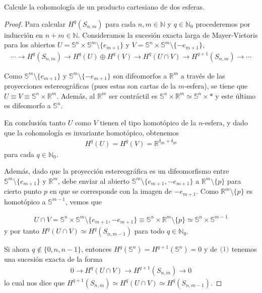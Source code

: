 \documentclass[11pt]{article}
\newcommand{\N}{\mathbb{N}}
\newcommand{\R}{\mathbb{R}}
\newcommand{\Ss}{\mathbb{S}}
\newcommand{\paint}[1]{\color{color}{#1}}
\newenvironment{exercise}[2][Ejercicio]{\begin{trivlist}
\item[\hskip \labelsep \paint{{\bfseries #1}}\hskip \labelsep {\bfseries #2.}]}{\end{trivlist}}
\begin{document}
\begin{exercise}{11 (d)} Calcule la cohomología de un producto cartesiano de dos esferas.
\end{exercise}
\begin{proof} Para calcular $H^q(S_{n,m})$ para cada $n,m \in \N$ y $q \in \N_0$ procederemos por inducción en $n+m \in \N$. Consideramos la sucesión exacta larga de Mayer-Vietoris para los abiertos $U = \Ss^n \times \Ss^m \setminus \{e_{m+1}\}$ y $V = \Ss^n \times \Ss^m \setminus \{-e_{m+1}\}$, 
\begin{align*}
\cdots \to H^q(S_{n,m}) \to H^q(U) \oplus H^q(V) \to H^q(U \cap V) \to H^{q+1}(S_{n,m}) \to \cdots
\end{align*}

Como $\Ss^m \setminus \{e_{m+1}\}$ y $\Ss^m \setminus \{-e_{m+1}\}$ son difeomorfos a $\R^m$ a través de las proyecciones estereográficas (pues estas son cartas de la $m$-esfera), se tiene que $U \equiv V \equiv \Ss^n \times \R^m$. Además, al $\R^m$ ser contráctil es $\Ss^n \times \R^m \simeq \Ss^n \times \ast$ y este último es difeomorfo a $\Ss^n$. 

En conclusión tanto $U$ como $V$ tienen el tipo homotópico de la $n$-esfera, y dado que la cohomología es invariante homotópico, obtenemos
\begin{align*}
H^q(U) = H^q(V) = \R^{\delta_{qn} + \delta_{q0}}
\end{align*}
para cada $q \in \N_0$.

Además, dado que la proyección estereográfica es un difeomorfismo entre $\Ss^m \setminus \{e_{m+1}\}$ y $\R^m$, debe enviar al abierto  $\Ss^m \setminus \{e_{m+1},-e_{m+1}\}$ a $\R^m \setminus \{p\}$ para cierto punto $p$ en que se corresponde con la imagen de $-e_{m+1}$. Como $\R^m \setminus \{p\}$ es homotópico a $\Ss^{m-1}$, vemos que

\begin{align*}
U \cap V = \Ss^n \times \Ss^m \setminus \{e_{m+1},-e_{m+1}\} \equiv \Ss^n \times \R^m \setminus \{p\} \simeq \Ss^n \times \Ss^{m-1}
\end{align*}
y por tanto $H^q(U \cap V) \simeq H^q(S_{n,m-1})$ para todo $q \in \N_0$.

Si ahora $q \not \in \{0,n,n-1\}$, entonces $H^q(\Ss^n) = H^{q+1}(\Ss^n) = 0$ y de $\paint{(1)}$ tenemos una sucesión exacta de la forma
\begin{align*}
0 \to H^q(U \cap V) \to H^{q+1}(S_{n,m}) \to  0
\end{align*}
lo cual nos dice que $H^{q+1}(S_{n,m}) \simeq H^q(U \cap V) \simeq H^{q}(S_{n,m-1})$.


\end{proof}
\end{document}
